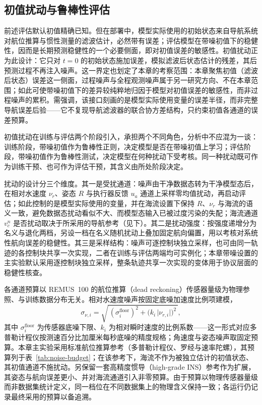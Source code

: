 \subsection{初值扰动与鲁棒性评估}
\label{subsec:ic-perturbation}

前述评估默认初值精确已知。但在部署中，模型实际使用的初始状态来自导航系统对航位推算与惯性测量的滤波估计，必然带有误差；评估模型在带噪初值下的稳健性，因而是长期预测稳健性的一个必要侧面，即对初值误差的敏感性。初值扰动正为此设计：它只对 \(t=0\) 的初始状态施加误差，模拟滤波后状态估计的残差，其后预测过程不再注入噪声。这一界定也划定了本章的考察范围：本章聚焦初值（滤波后状态）误差这一侧面，过程噪声与全程观测噪声属于另一研究方向、不在本章范围；如此可使带噪初值下的差异较纯粹地归因于模型对初值误差的敏感性，而非过程噪声的累积。需强调，该接口刻画的是模型实际使用变量的误差半径，而非完整导航误差后验——它不复现导航滤波器的联合协方差结构，只约束初值各通道的误差预算。

初值扰动在训练与评估两个阶段引入，承担两个不同角色，分析中不应混为一谈：训练阶段，带噪初值作为鲁棒性正则，决定模型是否在带噪初值上学习；评估阶段，带噪初值作为鲁棒性测试，决定模型在何种扰动下受考核。同一种扰动既可作为训练干预、也可作为评估干预，其含义由所处阶段决定。

扰动的设计分三个维度。其一是受扰通道：噪声由干净数据态转为干净模型态后，在相对水速度 \(\nu_r\)、姿态 \(R\) 与执行器反馈 \(u_a\) 通道上采样零均值扰动，再启动评估；如此控制的是模型实际使用的变量，并在海流设置下保持 \(R\)、\(\nu_r\) 与海流的语义一致，避免数据态扰动看似不大、而模型态输入已被过度污染的失配；海流通道 \(v_c^n\) 是否扰动取决于所采用的导航参考（见下）。其二是扰动强度：按强度递增分为名义与退化两档，另设一档在名义随机扰动上叠加固定航向偏置，用以考核对系统性航向误差的稳健性。其三是采样结构：噪声可逐控制块独立采样，也可由同一轨迹的各控制块共享一次实现，二者在训练与评估两端均可实例化；本章带噪设置的主实验默认采用逐控制块独立采样，整条轨迹共享一次实现的变体用于协议层面的稳健性核查。

各通道预算以 REMUS~100 的航位推算（dead reckoning）传感器量级为物理参照、与训练数据分布无关。相对水速度噪声按固定底噪加速度比例项建模，
\begin{equation}
  \sigma_{\nu,i}=\sqrt{\,(\sigma_i^{\mathrm{floor}})^2+\big(k_i\,\lvert\nu_{r,i}\rvert\big)^2\,},
  \label{eq:nu-noise-model}
\end{equation}
其中 \(\sigma_i^{\mathrm{floor}}\) 为传感器底噪下限、\(k_i\) 为相对瞬时速度的比例系数——这一形式对应多普勒计程仪按测速百分比加厘米每秒底噪的精度规格；角速度与姿态噪声取固定预算。本章主实验采用标准航位推算参考（多普勒计程仪、罗经与速率陀螺），其预算列于表~\ref{tab:noise-budget}；在该参考下，海流不作为被独立估计的初值状态、其初值通道不施扰动。另保留一套高精度惯导（high-grade INS）参考作为扩展，其姿态与航向误差更小、并对海流通道引入非零预算。由于预算以物理传感器量级而非数据集统计定义，同一档位在不同数据集上的物理含义保持一致；各运行仍记录最终采用的预算以备追溯。

